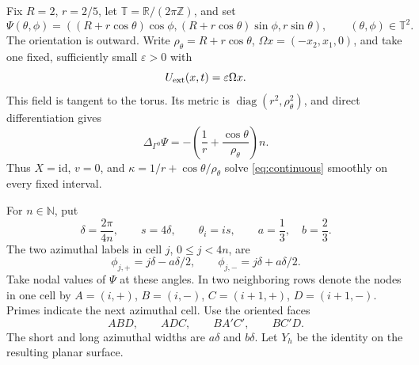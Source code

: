 \documentclass[11pt,a4paper]{article}
\numberwithin{equation}{section}
\theoremstyle{remark}
\newcommand{\R}{\mathbb R}
\newcommand{\T}{\mathbb T}
\newcommand{\id}{\mathrm{id}}
\newcommand{\diag}{\operatorname{diag}}
\begin{document}
Fix \(R=2\), \(r=2/5\), let \(\T=\R/(2\pi\mathbb Z)\), and set
\begin{equation}\label{eq:torus}
 \Psi(\theta,\phi)=
 ((R+r\cos\theta)\cos\phi,(R+r\cos\theta)\sin\phi,r\sin\theta),
 \qquad (\theta,\phi)\in\T^2.
\end{equation}
The orientation is outward. Write \(\rho_\theta=R+r\cos\theta\),
\(\Omega x=(-x_2,x_1,0)\), and take one fixed, sufficiently small
\(\varepsilon>0\) with
\begin{equation}\label{eq:field}
 U_{\rm ext}(x,t)=\varepsilon\Omega x .
\end{equation}
This field is tangent to the torus. Its metric is
\(\diag(r^2,\rho_\theta^2)\), and direct differentiation gives
\[
 \Delta_{\Gamma^0}\Psi
   =-\left(\frac1r+\frac{\cos\theta}{\rho_\theta}\right)n .
\]
Thus \(X=\id\), \(v=0\), and \(\kappa=1/r+\cos\theta/\rho_\theta\)
solve \eqref{eq:continuous} smoothly on every fixed interval.

For \(n\in\mathbb N\), put
\[
 \delta=\frac{2\pi}{4n},\qquad s=4\delta,\qquad
 \theta_i=is,\qquad a=\frac13,\quad b=\frac23 .
\]
The two azimuthal labels in cell \(j\), \(0\leq j<4n\), are
\[
 \phi_{j,+}=j\delta-a\delta/2,\qquad
 \phi_{j,-}=j\delta+a\delta/2 .
\]
Take nodal values of \(\Psi\) at these angles. In two neighboring rows
denote the nodes in one cell by \(A=(i,+)\), \(B=(i,-)\),
\(C=(i+1,+)\), \(D=(i+1,-)\). Primes indicate the next azimuthal cell.
Use the oriented faces
\begin{equation}\label{eq:faces}
 ABD,\qquad ADC,\qquad BA'C',\qquad BC'D .
\end{equation}
The short and long azimuthal widths are \(a\delta\) and \(b\delta\).
Let \(Y_h\) be the identity on the resulting planar surface.
\end{document}
